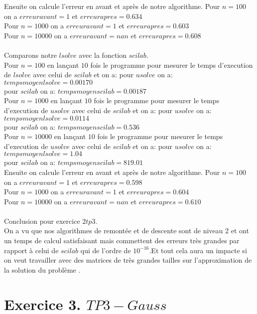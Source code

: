 \documentclass[]{article}
\begin{document}
\begin{itemize}
\begin{itemize}
\begin{itemize}
Ensuite on calcule l'erreur en avant et après de notre algorithme.
Pour $n=100$ on a $erreuravant= 1 $ et $erreurapres= 0.634 $\\
Pour $n=1000$ on a $erreuravant= 1 $ et $erreurapres= 0.603 $\\
Pour $n=10000$ on a $erreuravant= nan $ et $erreurapres= 0.608 $\\
\\


Comparons notre $lsolve$ avec la fonction $scilab$.\\
Pour $n=100$ en lançant $10$ fois le programme pour mesurer le temps d'execution de $lsolve$ avec celui de $scilab$ et on a:
pour $usolve$ on a: $tempsmoyenlsolve= 0.00170$\\
pour $scilab$ on a: $tempsmoyenscilab= 0.00187$\\

Pour $n=1000$ en lançant $10$ fois le programme pour mesurer le temps d'execution de $usolve$ avec celui de $scilab$ et on a:
pour $usolve$ on a: $tempsmoyenlsolve= 0.0114$\\
pour $scilab$ on a: $tempsmoyenscilab= 0.536$\\

Pour $n=10000$ en lançant $10$ fois le programme pour mesurer le temps d'execution de $usolve$ avec celui de $scilab$ et on a:
pour $usolve$ on a: $tempsmoyenlsolve= 1.04$\\
pour $scilab$ on a: $tempsmoyenscilab= 819.01$\\

Ensuite on calcule l'erreur en avant et après de notre algorithme.
Pour $n=100$ on a $erreuravant= 1 $ et $erreurapres= 0.598 $\\
Pour $n=1000$ on a $erreuravant= 1 $ et $erreurapres= 0.604 $\\
Pour $n=10000$ on a $erreuravant= nan $ et $erreurapres= 0.610 $\\
\\
Conclusion pour exercice $2 tp3$.\\
On a vu que nos algorithmes de remontée et de descente sont de niveau 2 et ont un temps de calcul satisfaisant mais commettent des erreurs très grandes par rapport à celui de $scilab$ qui de l'ordre de $10^{-16}$.Et tout cela aura un impacte si on veut travailler avec des matrices de très grandes tailles sur l'approximation de la solution du problème .\\

\section{Exercice 3. $TP3 - Gauss$}


\end{itemize}
\end{itemize}
\end{itemize}
\end{document}
